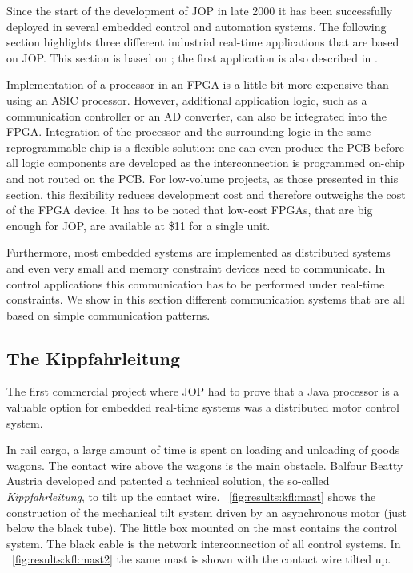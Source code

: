 Since the start of the development of JOP in late 2000 it has been
successfully deployed in several embedded control and automation
systems. The following section highlights three different industrial
real-time applications that are based on JOP. This section is based
on \cite{jop:app}; the first application is also described in
\cite{jop:wises03}.

Implementation of a processor in an FPGA is a little bit more
expensive than using an ASIC processor. However, additional
application logic, such as a communication controller or an AD
converter, can also be integrated into the FPGA. Integration of the
processor and the surrounding logic in the same reprogrammable chip
is a flexible solution: one can even produce the PCB before all logic
components are developed as the interconnection is programmed on-chip
and not routed on the PCB. For low-volume projects, as those
presented in this section, this flexibility reduces development cost
and therefore outweighs the cost of the FPGA device. It has to be
noted that low-cost FPGAs, that are big enough for JOP, are available
at \$11 for a single unit.

Furthermore, most embedded systems are implemented as distributed
systems and even very small and memory constraint devices need to
communicate. In control applications this communication has to be
performed under real-time constraints. We show in this section
different communication systems that are all based on simple
communication patterns.

\subsection{The Kippfahrleitung}
\label{sec:app:kfl}

The first commercial project where JOP had to prove that a Java
processor is a valuable option for embedded real-time systems was a
distributed motor control system.

In rail cargo, a large amount of time is spent on loading and
unloading of goods wagons. The contact wire above the wagons is the
main obstacle. Balfour Beatty Austria developed and patented a
technical solution, the so-called \emph{Kippfahrleitung}, to tilt up
the contact wire. \figurename~\ref{fig:results:kfl:mast} shows the
construction of the mechanical tilt system driven by an asynchronous
motor (just below the black tube). The little box mounted on the mast
contains the control system. The black cable is the network
interconnection of all control systems. In
\figurename~\ref{fig:results:kfl:mast2} the same mast is shown with
the contact wire tilted up.


